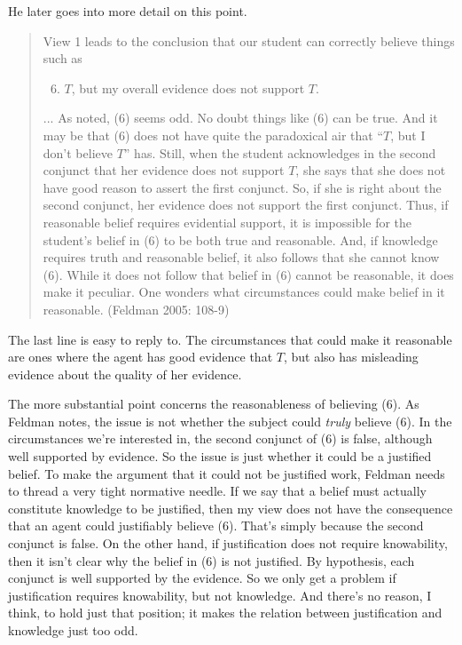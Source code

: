 \noindent He later goes into more detail on this point.

\begin{quote}
View 1 leads to the conclusion that our student can correctly believe things such as

\begin{enumerate}
\setcounter{enumi}{5}
\item \(T\), but my overall evidence does not support \(T\).
\end{enumerate}

\noindent ... As noted, (6) seems odd. No doubt things like (6) can be true. And it may be that (6) does not have quite the paradoxical air that ``\(T\), but I don't believe \(T\)'' has. Still, when the student acknowledges in the second conjunct that her evidence does not support \(T\), she says that she does not have good reason to assert the first conjunct. So, if she is right about the second conjunct, her evidence does not support the first conjunct. Thus, if reasonable belief requires evidential support, it is impossible for the student's belief in (6) to be both true and reasonable. And, if knowledge requires truth and reasonable belief, it also follows that she cannot know (6). While it does not follow that belief in (6) cannot be reasonable, it does make it peculiar. One wonders what circumstances could make belief in it reasonable. (Feldman 2005: 108-9)
\end{quote}

\noindent The last line is easy to reply to. The circumstances that could make it reasonable are ones where the agent has good evidence that \(T\), but also has misleading evidence about the quality of her evidence. 

The more substantial point concerns the reasonableness of believing (6). As Feldman notes, the issue is not whether the subject could \textit{truly} believe (6). In the circumstances we're interested in, the second conjunct of (6) is false, although well supported by evidence. So the issue is just whether it could be a justified belief. To make the argument that it could not be justified work, Feldman needs to thread a very tight normative needle. If we say that a belief must actually constitute knowledge to be justified, then my view does not have the consequence that an agent could justifiably believe (6). That's simply because the second conjunct is false. On the other hand, if justification does not require knowability, then it isn't clear why the belief in (6) is not justified. By hypothesis, each conjunct is well supported by the evidence. So we only get a problem if justification requires knowability, but not knowledge. And there's no reason, I think, to hold just that position; it makes the relation between justification and knowledge just too odd.

